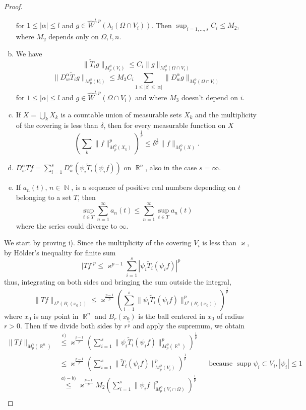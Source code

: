 \documentclass[12pt]{article}
\theoremstyle{definition}
\DeclareMathOperator\supp{supp}
\DeclareMathOperator\rr{\mathbb{R}}
\DeclareMathOperator\nn{\mathbb{N}}
\begin{document}
\begin{proof}
\begin{enumerate}[a)]
for $1\le |\alpha|\le l$ and $g \in \widehat W^{l,p}(\lambda_i(\Omega \cap V_i))$. Then $\sup_{i=1,...,s} C_i \le M_2$, where $M_2$ depends only on $\Omega,l,n$.
\item We have
\[ \| \widetilde T_ig\|_{M_p^\phi(V_i)}\le C_i \|g\|_{M_p^\phi(\Omega \cap V_i)}\]
\[\| D^\alpha_w \widetilde T_ig\|_{M_p^\phi(V_i)} \le   M_3C_i\sum_{1\le |\beta|\le|\alpha| }\| D^\alpha_wg\|_{M_p^\phi(\Omega \cap V_i)}\]  
for $1\le |\alpha|\le l$ and $g \in \widehat W^{l,p}(\Omega \cap V_i)$ and where $M_3$ doesn't depend on $i$. 
\item If $X= \bigcup_k X_k$ is a countable union of measurable sets $X_k$ and the multiplicity of the covering is less than $\delta$, then for every measurable function on $X$
\[ \left ( \sum_k \| f\|^p_{M^\phi_p(X_k)} \right )^{\frac{1}{p}} \le \delta^{\frac{1}{p}}\| f\|_{M^\phi_p(X)}. \] 
\item $D^\alpha_wTf = \sum_{i=1}^s D^\alpha_w (\psi_i\widetilde T_i(\psi_if))$ on $\rr^n$, also in the case $s=\infty.$
\item If $a_n(t)$, $n\in \nn$, is a sequence of positive real numbers depending on $t$ belonging to a set $T$, then
\[ \sup_{t \in T} \sum_{n=1}^\infty a_n(t) \le \sum_{n=1}^\infty \sup_{t \in T} a_n(t)\]
where the series could diverge to $\infty.$
\end{enumerate}
We start by proving i). Since the multiplicity of the covering $V_i$ is less than $ \varkappa$, by Hölder's inequality for finite sum
\[ |Tf|^p \le  \varkappa^{p-1} \sum_{i=1}^s |\psi_i\widetilde T_i(\psi_if)|^p\]
thus, integrating on both sides and bringing the sum outside the integral,
\[\| Tf \|_{L^p(B_r(x_0))}\le  \varkappa^{\frac{p-1}{p}} \left ( \sum_{i=1}^s \|\psi_i\widetilde T_i(\psi_if)\|_{L^p(B_r(x_0))}^p \right)^{\frac{1}{p}}\]
where $x_0$ is any point in $\rr^n$ and $ B_r(x_0)$ is the ball centered in $ x_0$ of radius $r>0$. Then if we divide both sides by $r^{\frac{\gamma}{p}}$ and apply the supremum, we obtain
\begin{align*}
\|Tf \|_{M_p^\gamma(\rr^n)} &\overset{e)}\le  \varkappa^{\frac{p-1}{p}} \left ( \sum_{i=1}^s \|\psi_i\widetilde T_i(\psi_if)\|_{M^\phi_p(\rr^n)}^p \right)^{\frac{1}{p}} \\
							&\le  \varkappa^{\frac{p-1}{p}} \left ( \sum_{i=1}^s \|\widetilde T_i(\psi_if)\|_{M^\phi_p(V_i)}^p \right)^{\frac{1}{p}} && \text{because } \supp \psi_i \subset V_i,|\psi_i|\le1\\
							&\overset{a)-b)}\le \varkappa^{\frac{p-1}{p}} M_2\left ( \sum_{i=1}^s \|\psi_if\|_{M^\phi_p(V_i\cap\Omega)}^p \right)^{\frac{1}{p}}&& \\

\end{align*}
\end{proof}
\end{document}
